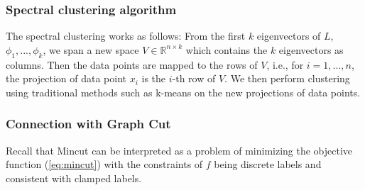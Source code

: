 \subsubsection*{Spectral clustering algorithm}\label{sec:specalg}
The spectral clustering works as follows: From the first $k$ eigenvectors of $L$,
$\phi_1, ..., \phi_k$, we span a new space $V \in \mathbb{R}^{n\times k}$ which
contains the $k$ eigenvectors as columns. Then the data points are mapped to the
rows of $V$, i.e., for $i = 1, ..., n$, the projection of data point $x_i$ is
the $i$-th row of $V$. We then perform clustering using traditional methods such as
k-means on the new projections of data points.
%
%
%
\subsubsection*{Connection with Graph Cut}

Recall that Mincut can be interpreted as a problem of minimizing the objective function (\ref{eq:mincut}) with the constraints of $f$ being discrete labels and consistent with clamped labels. 

